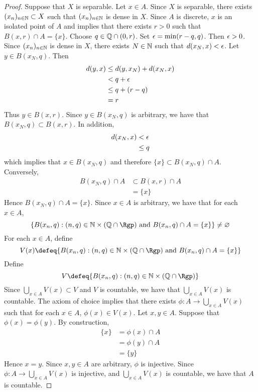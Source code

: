 \documentclass{book}
\begin{document}
\begin{proof}
	Suppose that $X$ is separable. Let $x \in A$. Since $X$ is separable, there exists $(x_n)_{n \in \mathbb{N}} \subset X$ such that $(x_n)_{n \in \mathbb{N}}$ is dense in $X$. Since $A$ is discrete, $x$ is an isolated point of $A$ and  implies that there exists $r > 0$ such that $B(x, r) \cap A = \{x\}$. Choose $q \in \mathbb{Q} \cap (0,r)$. Set $\epsilon = \min(r -q, q)$. Then $\epsilon > 0$. Since $(x_n)_{n \in \mathbb{N}}$ is dense in $X$, there exists $N \in \mathbb{N}$ such that $d(x_N, x) < \epsilon$. Let $y \in B(x_N, q)$. Then
	\begin{align*}
		d(y, x)
		& \leq d(y, x_N) + d(x_N, x) \\
		& < q  + \epsilon \\
		& \leq q + (r - q) \\
		& = r
	\end{align*}
	Thus $y \in B(x, r)$. Since $y \in B(x_N, q)$ is arbitrary, we have that $B(x_N, q) \subset B(x, r)$. In addition, 
	\begin{align*}
		d(x_N, x)
		& < \epsilon \\
		& \leq q 
	\end{align*}
	which implies that $x \in B(x_N, q)$ and therefore $\{x\} \subset B(x_N, q) \cap A$. Conversely, 
	\begin{align*}
		B(x_N, q) \cap A 
		& \subset B(x, r) \cap A \\
		& = \{x\}
	\end{align*}
	Hence $B(x_N, q) \cap A = \{x\}$. Since $x \in A$ is arbitrary, we have that for each $x \in A$, 
	$$\{B(x_n, q):  (n, q) \in \N \times (\Q \cap \Rgp) \text{ and } B(x_n, q) \cap A = \{x\}\} \neq \varnothing$$ 
	For each $x \in A$, define 
	$$V(x) \defeq \{B(x_n, q):  (n, q) \in \N \times (\Q \cap \Rgp) \text{ and } B(x_n, q) \cap A = \{x\}\}$$ 
	Define 
	$$V \defeq \{B(x_n, q):  (n, q) \in \N \times (\Q \cap \Rgp) \}$$
	Since $\bigcup\limits_{x \in A} V(x) \subset V$ and $V$ is countable, we have that $\bigcup\limits_{x \in A} V(x)$ is countable. The axiom of choice implies that there exists $\phi: A \rightarrow \bigcup\limits_{x \in A} V(x)$ such that for each $x \in A$, $\phi(x) \in V(x)$. Let $x,y \in A$. Suppose that $\phi(x) = \phi(y)$. By construction,
	\begin{align*}
		\{x\}
		& = \phi(x) \cap A \\
		& = \phi(y) \cap A \\
		& = \{y\}
	\end{align*}
	Hence $x = y$. Since $x,y \in A$ are arbitrary, $\phi$ is injective. Since $\phi: A \rightarrow \bigcup\limits_{x \in A} V(x)$ is injective, and $\bigcup\limits_{x \in A} V(x)$ is countable, we have that $A$ is countable. 
\end{proof}
\end{document}
